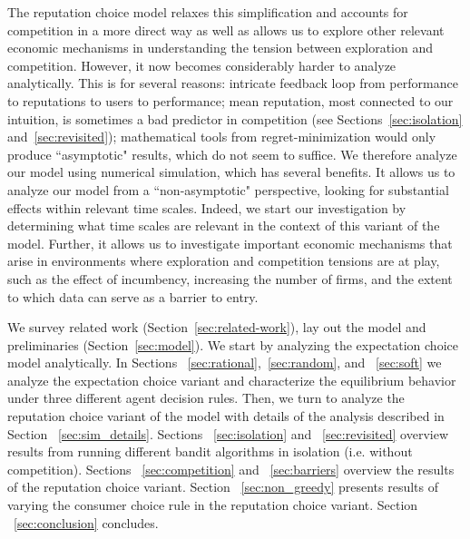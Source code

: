 The reputation choice model relaxes this simplification and accounts for competition in a more direct way as well as allows us to explore other relevant economic mechanisms in understanding the tension between exploration and competition. However, it now becomes considerably harder to analyze analytically. This is for several reasons: intricate feedback loop from performance to reputations to users to performance;
%
mean reputation, most connected to our intuition, is sometimes a bad predictor in competition (see Sections~\ref{sec:isolation} and~\ref{sec:revisited});
%
mathematical tools from regret-minimization would only produce ``asymptotic" results, which do not seem to suffice. We therefore analyze our model using numerical simulation, which has several benefits. It allows us to analyze our model from a ``non-asymptotic" perspective, looking for substantial effects within relevant time scales. Indeed, we start our investigation by determining what time scales are relevant in the context of this variant of the model. Further, it allows us to investigate important economic mechanisms that arise in environments where exploration and competition tensions are at play, such as the effect of incumbency, increasing the number of firms, and the extent to which data can serve as a barrier to entry.

We survey related work (Section~\ref{sec:related-work}), lay out the model and preliminaries (Section~\ref{sec:model}). We start by analyzing the expectation choice model analytically. In Sections ~\ref{sec:rational},~\ref{sec:random}, and ~\ref{sec:soft} we analyze the expectation choice variant and characterize the equilibrium behavior under three different agent decision rules. Then, we turn to analyze the reputation choice variant of the model with details of the analysis described in Section ~\ref{sec:sim_details}. Sections ~\ref{sec:isolation} and ~\ref{sec:revisited} overview results from running different bandit algorithms in isolation (i.e. without competition). Sections ~\ref{sec:competition} and ~\ref{sec:barriers} overview the results of the reputation choice variant. Section ~\ref{sec:non_greedy} presents results of varying the consumer choice rule in the reputation choice variant. Section ~\ref{sec:conclusion} concludes.


